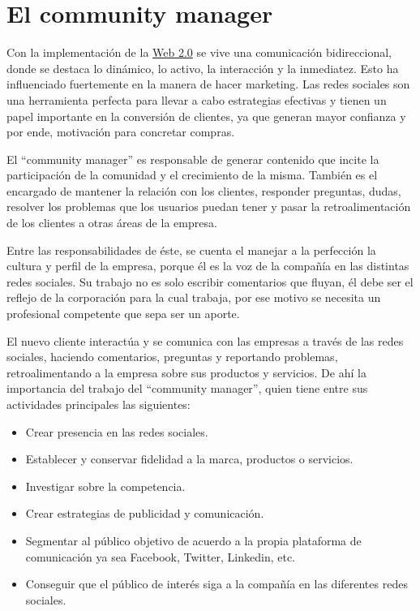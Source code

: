 \chapter{El community manager}

Con la implementación de la \href{https://en.wikipedia.org/wiki/Web\_2.0}{Web 2.0} se vive una comunicación bidireccional, donde se destaca lo dinámico, lo activo, la interacción y la inmediatez. Esto ha influenciado fuertemente en la manera de hacer marketing. Las redes sociales son una herramienta perfecta para llevar a cabo estrategias efectivas y tienen un papel importante en la conversión de clientes, ya que generan mayor confianza y por ende, motivación para concretar compras.

El “community manager” es responsable de generar contenido que incite la participación de la comunidad y el crecimiento de la misma. También es el encargado de mantener la relación con los clientes, responder preguntas, dudas, resolver los problemas que los usuarios puedan tener y pasar la retroalimentación de los clientes a otras áreas de la empresa.

Entre las responsabilidades de éste, se cuenta el manejar a la perfección la cultura y perfil de la empresa, porque él es la voz de la compañía en las distintas redes sociales. Su trabajo no es solo escribir comentarios que fluyan, él debe ser el reflejo de la corporación para la cual trabaja, por ese motivo se necesita un profesional competente que sepa ser un aporte.

El nuevo cliente interactúa y se comunica con las empresas a través de las redes sociales, haciendo comentarios, preguntas y reportando problemas, retroalimentando a la empresa sobre sus productos y servicios. De ahí la importancia del trabajo del “community manager”, quien tiene entre sus actividades principales las siguientes:
\begin{itemize}
    \item Crear presencia en las redes sociales.
    \item Establecer y conservar fidelidad a la marca, productos o servicios.
    \item Investigar sobre la competencia.
    \item Crear estrategias de publicidad y comunicación.
    \item Segmentar al público objetivo de acuerdo a la propia plataforma de comunicación ya sea Facebook, Twitter, Linkedin, etc.
    \item Conseguir que el público de interés siga a la compañía en las diferentes redes sociales.
\end{itemize}

